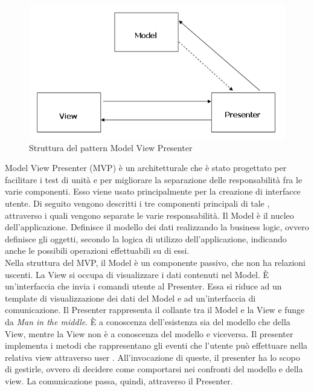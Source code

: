   	 \label{app:MVP}
	\begin{figure}[H]\centering
    \includegraphics[scale=0.5]{SpecificaTecnica/Pics/MVP}
    \caption{Struttura del pattern Model View Presenter}
	\end{figure}
	Model View Presenter (MVP) è un  architetturale che è stato progettato per facilitare i test di unità e per migliorare la separazione delle responsabilità fra le varie componenti. Esso viene usato principalmente per la creazione di interfacce utente.
		Di seguito vengono descritti i tre componenti principali di tale , attraverso i quali vengono separate le varie responsabilità.
			Il Model è il nucleo dell'applicazione. Definisce il modello dei dati realizzando la business logic, ovvero definisce gli oggetti, secondo la logica di utilizzo dell'applicazione, indicando anche le possibili operazioni effettuabili su di essi.\\
			Nella struttura del  MVP, il Model è un componente passivo, che non ha relazioni uscenti.
			La View si occupa di visualizzare i dati contenuti nel Model. È un'interfaccia che invia i comandi utente al Presenter. Essa si riduce ad un template di visualizzazione dei dati del Model e ad un'interfaccia di comunicazione.
			Il Presenter rappresenta il collante tra il Model e la View e funge da \textit{Man in the middle}. È a conoscenza dell'esistenza sia del modello che della View, mentre la View non è a conoscenza del modello e viceversa. Il presenter implementa i metodi che rappresentano gli eventi che l'utente può effettuare nella relativa view attraverso user . All'invocazione di queste, il presenter ha lo scopo di gestirle, ovvero di decidere come comportarsi nei confronti del modello e della view. La comunicazione passa, quindi, attraverso il Presenter.
